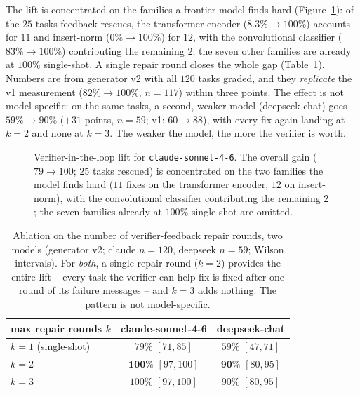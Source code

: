 \documentclass{article}
\begin{document}
The lift is concentrated on the families a frontier model finds hard (Figure~\ref{fig:lift}): of the $25$ tasks feedback rescues, the transformer encoder ($8.3\%\to100\%$) accounts for $11$ and insert-norm ($0\%\to100\%$) for $12$, with the convolutional classifier ($83\%\to100\%$) contributing the remaining $2$; the seven other families are already at $100\%$ single-shot. A single repair round closes the whole gap (Table~\ref{tab:ablation}). Numbers are from generator v2 with all $120$ tasks graded, and they \emph{replicate} the v1 measurement ($82\%\to100\%$, $n{=}117$) within three points. The effect is not model-specific: on the same tasks, a second, weaker model (deepseek-chat) goes $59\%\to90\%$ ($+31$ points, $n{=}59$; v1: $60\to88$), with every fix again landing at $k{=}2$ and none at $k{=}3$. The weaker the model, the more the verifier is worth.

\begin{figure}[t]
\centering
{}
\caption{Verifier-in-the-loop lift for \texttt{claude-sonnet-4-6}. The overall gain ($79\to100$; $25$ tasks rescued) is concentrated on the two families the model finds hard ($11$ fixes on the transformer encoder, $12$ on insert-norm), with the convolutional classifier contributing the remaining $2$; the seven families already at $100\%$ single-shot are omitted.}
\label{fig:lift}
\end{figure}

\begin{table}[t]
\centering\small
\begin{tabular}{lcc}
\toprule
max repair rounds $k$ & claude-sonnet-4-6 & deepseek-chat \\
\midrule
$k=1$ (single-shot) & $79\%$ $[71,85]$ & $59\%$ $[47,71]$ \\
$k=2$ & $\mathbf{100\%}$ $[97,100]$ & $\mathbf{90\%}$ $[80,95]$ \\
$k=3$ & $100\%$ $[97,100]$ & $90\%$ $[80,95]$ \\
\bottomrule
\end{tabular}
\caption{Ablation on the number of verifier-feedback repair rounds, two models (generator v2; claude $n{=}120$, deepseek $n{=}59$; Wilson intervals). For \emph{both}, a single repair round ($k{=}2$) provides the entire lift -- every task the verifier can help fix is fixed after one round of its failure messages -- and $k{=}3$ adds nothing. The pattern is not model-specific.}
\label{tab:ablation}
\end{table}
\end{document}
